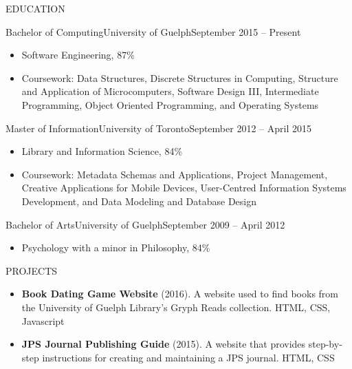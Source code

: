 \documentclass[]{mcdowellcv}
\begin{document}
	\begin{cvsection}{EDUCATION}
		\begin{cvsubsection}{Bachelor of Computing}{University of Guelph}{September 2015 -- Present}
			\begin{itemize}
				\item Software Engineering, 87\%
				\item Coursework: Data Structures, Discrete Structures in Computing, Structure and Application of Microcomputers, Software Design III, Intermediate Programming, Object Oriented Programming, and Operating Systems
			\end{itemize}
		\end{cvsubsection}
		\begin{cvsubsection}{Master of Information}{University of Toronto}{September 2012 -- April 2015}
			\begin{itemize}
				\item Library and Information Science, 84\%
				\item Coursework: Metadata Schemas and Applications, Project Management, Creative Applications for Mobile Devices, User-Centred Information Systems Development, and Data Modeling and Database Design
			\end{itemize}
		\end{cvsubsection}
		\begin{cvsubsection}{Bachelor of Arts}{University of Guelph}{September 2009 -- April 2012}
			\begin{itemize}
				\item Psychology with a minor in Philosophy, 84\%
			\end{itemize}
		\end{cvsubsection}
	\end{cvsection}
	
	\begin{cvsection}{PROJECTS}
		\begin{cvsubsection}{}{}{}
			\begin{itemize}
				\item \textbf{Book Dating Game Website} (2016). A website used to find books from the University of Guelph Library's Gryph Reads collection. HTML, CSS, Javascript
				\item \textbf{JPS Journal Publishing Guide} (2015). A website that provides step-by-step instructions for creating and maintaining a JPS journal. HTML, CSS
			\end{itemize}
		\end{cvsubsection}
	\end{cvsection}
	
\end{document}
